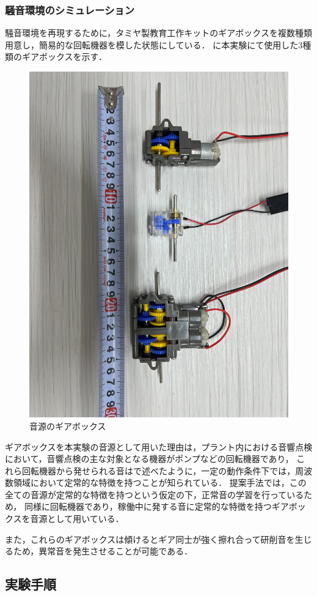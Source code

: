 \documentclass[../main]{subfiles}
\begin{document}
\subsubsection{騒音環境のシミュレーション} \label{subsubsec:noise_simulation}
騒音環境を再現するために，タミヤ製教育工作キットのギアボックスを複数種類用意し，簡易的な回転機器を模した状態にしている．
に本実験にて使用した3種類のギアボックスを示す．


\begin{figure}[t]
  \centering
  \includegraphics[angle=90,keepaspectratio, width=0.7\linewidth]{chap4/gearbox.jpg}
  \caption{音源のギアボックス}
  \label{fig:gearbox}
\end{figure}

ギアボックスを本実験の音源として用いた理由は，プラント内における音響点検において，音響点検の主な対象となる機器がポンプなどの回転機器であり，
これら回転機器から発せられる音はで述べたように，一定の動作条件下では，周波数領域において定常的な特徴を持つことが知られている．
提案手法では，この全ての音源が定常的な特徴を持つという仮定の下，正常音の学習を行っているため，
同様に回転機器であり，稼働中に発する音に定常的な特徴を持つギアボックスを音源として用いている．

また，これらのギアボックスは傾けるとギア同士が強く擦れ合って研削音を生じるため，異常音を発生させることが可能である．
\subsection{実験手順} \label{subsec:experiment_procedure}
\end{document}
